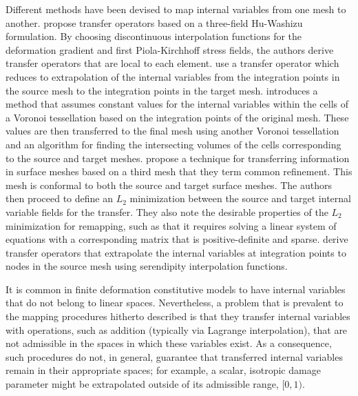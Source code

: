 \documentclass[12pt]{article}
\begin{document}
Different methods have been devised to map internal variables from one
mesh to another. \citet{Ortiz.Quigley:1991} propose transfer
operators based on a three-field Hu-Washizu formulation. By choosing
discontinuous interpolation functions for the deformation gradient and
first Piola-Kirchhoff stress fields, the authors derive transfer
operators that are local to each
element. \citet{Radovitzky.Ortiz:1999} use a transfer operator which
reduces to extrapolation of the internal variables from the
integration points in the source mesh to the integration points in the
target mesh.  \citet{Rashid:2002} introduces a method that assumes
constant values for the internal variables within the cells of a
Voronoi tessellation based on the integration points of the original
mesh. These values are then transferred to the final mesh using
another Voronoi tessellation and an algorithm for finding the
intersecting volumes of the cells corresponding to the source and
target meshes. \citet{Jiao.Heath:2004} propose a technique for
transferring information in surface meshes based on a third mesh that
they term common refinement. This mesh is conformal to both the source
and target surface meshes. The authors then proceed to define an $L_2$
minimization between the source and target internal variable fields
for the transfer. They also note the desirable properties of the $L_2$
minimization for remapping, such as that it requires solving a linear
system of equations with a corresponding matrix that is
positive-definite and sparse. \citet{Bucher.etal:2007} derive transfer
operators that extrapolate the internal variables at integration
points to nodes in the source mesh using serendipity interpolation
functions.

It is common in finite deformation constitutive models to have
internal variables that do not belong to linear spaces. Nevertheless,
a problem that is prevalent to the mapping procedures hitherto
described is that they transfer internal variables with operations,
such as addition (typically via Lagrange interpolation), that are not
admissible in the spaces in which these variables exist. As a
consequence, such procedures do not, in general, guarantee that
transferred internal variables remain in their appropriate spaces; for
example, a scalar, isotropic damage parameter might be extrapolated
outside of its admissible range, $[0,1)$.
\end{document}
